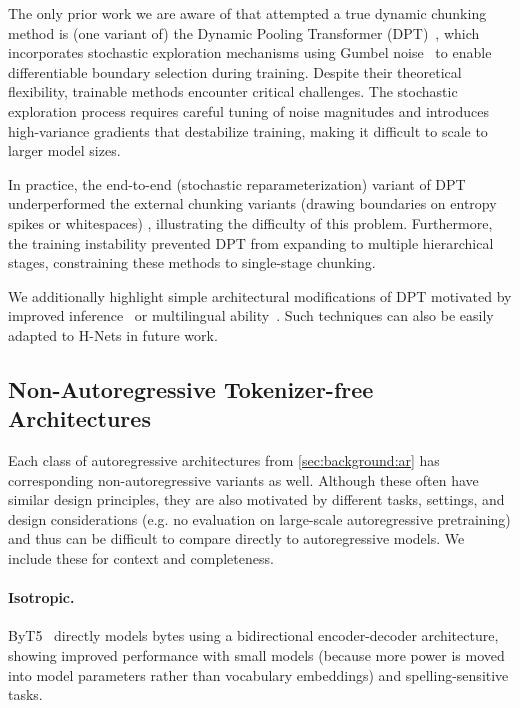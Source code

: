 \documentclass{article}
\newcommand{\citep}{\parencite}
\theoremstyle{plain}
\theoremstyle{remark}
\begin{document}
The only prior work we are aware of that attempted a true dynamic chunking method is (one variant of) the Dynamic Pooling Transformer (DPT)~\citep{DPT}, 
which incorporates stochastic exploration mechanisms using Gumbel noise~\citep{GumbelSoftmax,maddison2017concrete} to enable differentiable boundary selection during training.
Despite their theoretical flexibility, trainable methods encounter critical challenges.
The stochastic exploration process requires careful tuning of noise magnitudes and introduces high-variance gradients that destabilize training, making it difficult to scale to larger model sizes.

In practice, the end-to-end (stochastic reparameterization) variant of DPT underperformed the external chunking variants (drawing boundaries on entropy spikes or whitespaces) \citep{DPT}, illustrating the difficulty of this problem.
Furthermore, the training instability prevented DPT from expanding to multiple hierarchical stages, constraining these methods to single-stage chunking. 

We additionally highlight simple architectural modifications of DPT motivated by improved inference~\citep{fleshman2023toucan} or multilingual ability~\citep{MAGNET}.
Such techniques can also be easily adapted to H-Nets in future work.

\subsection{Non-Autoregressive Tokenizer-free Architectures}
\label{sec:background:nonar} 

Each class of autoregressive architectures from \cref{sec:background:ar} has corresponding non-autoregressive variants as well.
Although these often have similar design principles, they are also motivated by different tasks, settings, and design considerations (e.g. no evaluation on large-scale autoregressive pretraining) and thus can be difficult to compare directly to autoregressive models. We include these for context and completeness.

\paragraph{Isotropic.}
ByT5~\citep{ByT5} directly models bytes using a bidirectional encoder-decoder architecture, showing improved performance with small models (because more power is moved into model parameters rather than vocabulary embeddings) and spelling-sensitive tasks.
\end{document}
